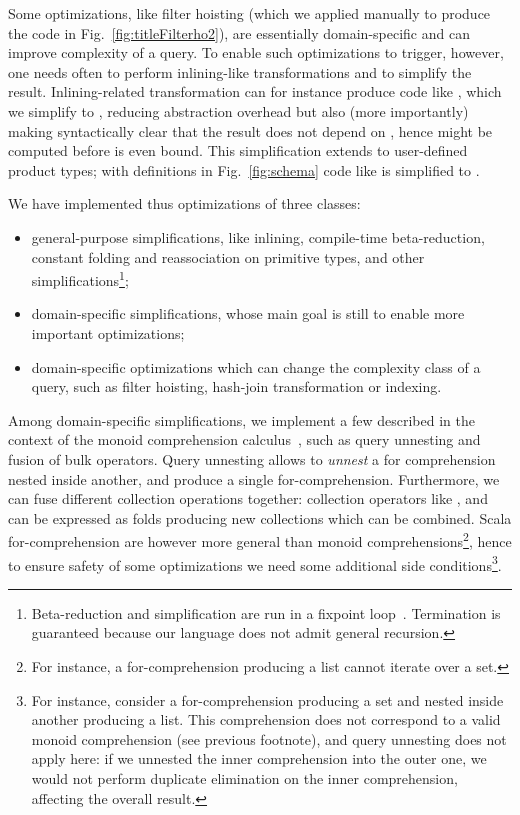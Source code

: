Some optimizations, like filter hoisting (which we applied manually to produce the code in Fig.~\ref{fig:titleFilterho2}),
are essentially domain-specific and can improve complexity of a query. To enable such optimizations to trigger, however, one needs often to perform inlining-like transformations and to simplify the result. Inlining-related transformation can for instance produce code like , which we simplify to , reducing abstraction overhead but also (more importantly) making syntactically clear that the result does not depend on , hence might be computed before  is even bound. This simplification extends to user-defined product types; with definitions in Fig.~\ref{fig:schema} code like  is simplified to .

We have implemented thus optimizations of three classes:
\begin{itemize}
\item general-purpose simplifications, like inlining, compile-time beta-reduction, constant folding and reassociation on primitive types, and other simplifications\footnote{Beta-reduction and simplification are run in a fixpoint loop~\citep{Peyton-Jones02}. Termination is guaranteed because our language does not admit general recursion.}; 
\item domain-specific simplifications, whose main goal is still to enable more important optimizations;
\item domain-specific optimizations which can change the complexity class of a query, such as filter hoisting, hash-join transformation or indexing.
\end{itemize}

Among domain-specific simplifications, we implement a few described in the context of the monoid comprehension calculus~\citep{Grust96Translating,Grust99PhD}, such as query unnesting and fusion of bulk operators. Query unnesting allows to \emph{unnest} a for comprehension nested inside another, and produce a single for-comprehension.
Furthermore, we can fuse different collection operations together: collection operators like ,  and  can be expressed as folds producing new collections which can be combined.
Scala for-comprehension are however more general than monoid comprehensions\footnote{For instance, a for-comprehension producing a list cannot iterate over a set.}, hence to ensure safety of some optimizations we need some additional side conditions\footnote{For instance, consider a for-comprehension producing a set and nested inside another producing a list. This comprehension does not correspond to a valid monoid comprehension (see previous footnote), and query unnesting does not apply here: if we unnested the inner comprehension into the outer one, we would not perform duplicate elimination on the inner comprehension, affecting the overall result.}.

